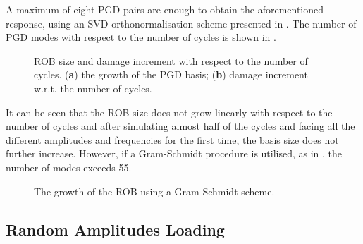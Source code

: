 A maximum of eight PGD pairs are enough to obtain the aforementioned response, using an SVD orthonormalisation scheme presented in . The number of PGD modes with respect to the number of cycles is shown in .
\begin{figure}[hbt!]
	\centering
	\begin{subfigure}[]{0.49\linewidth}
		
		\caption{}
		\label{fig_var_pgdmodes}
	\end{subfigure}
	\hfil
	\begin{subfigure}[]{0.49\linewidth}
		
		\caption{}
		\label{fig_var_damageincrement}
	\end{subfigure}
	\caption{ROB size and damage increment with respect to the number of cycles.  (\textbf{a}) the growth of the PGD basis; (\textbf{b}) damage increment w.r.t. the number of cycles.}
	\label{fig_var_pgdmodes_damageincrements}
\end{figure}


It can be seen that the ROB size does not grow linearly with respect to the number of cycles and after simulating almost half of the cycles and facing all the different amplitudes and frequencies for the first time, the basis size does not further increase. However, if a Gram-Schmidt procedure is utilised, as in , the number of modes exceeds 55.
\begin{figure}[hbt!]
	\centering
	
	\caption{The growth of the ROB using a Gram-Schmidt scheme.}
	\label{fig_var_pgdmodes_gs}
\end{figure}


\subsection{Random Amplitudes Loading}
\label{eg_random_loading}

